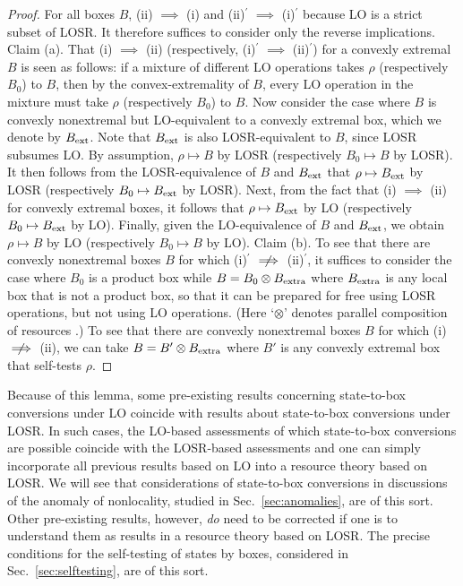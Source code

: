 \documentclass[12pt]{article}
\theoremstyle{plain}
\theoremstyle{definition}
\newcommand{\nimplies}{\centernot{\implies}}
\begin{document}
\begin{proof}
 For all boxes $B$,  (ii) $\implies$ (i) and (ii)$^{\prime}$ $\implies$ (i)$^{\prime}$ because LO is a strict subset of LOSR.  It therefore suffices to consider only the reverse implications.
Claim (a).  That (i) $\implies$ (ii) (respectively, (i)$^{\prime}$ $\implies$ (ii)$^{\prime}$) for a convexly extremal $B$ is seen as follows: if a mixture of different LO operations takes $\rho$ (respectively $B_0$) to $B$, then by the convex-extremality of $B$, every LO operation in the mixture must take $\rho$ (respectively $B_0$) to $B$.   Now consider the case where $B$ is convexly nonextremal but LO-equivalent to a convexly extremal box, which we denote by $B_{\rm ext}$.
Note that $B_{\rm ext}$ is also LOSR-equivalent to $B$, since LOSR subsumes LO.  By assumption, $\rho \mapsto B$ by LOSR (respectively $B_0 \mapsto B$ by LOSR).  It then follows from the LOSR-equivalence of 
$B$ and $B_{\rm ext}$  that $\rho \mapsto B_{\rm ext}$ by LOSR (respectively $B_0 \mapsto B_{\rm ext}$ by LOSR).  Next, from the fact that  (i) $\implies$ (ii) for convexly extremal boxes, it follows that $\rho \mapsto B_{\rm ext}$ by LO (respectively $B_0 \mapsto B_{\rm ext}$ by LO).  Finally, given the LO-equivalence of $B$ and $B_{\rm ext}$, we obtain $\rho \mapsto B$ by LO (respectively $B_0 \mapsto B$ by LO).   Claim (b).  To see that there are convexly nonextremal boxes $B$ for which  (i)$^{\prime}$ $\nimplies$ (ii)$^{\prime}$, it suffices to consider the case where $B_0$ is a product box  while $B = B_0  \otimes B_{\rm extra}$ where 
$B_{\rm extra}$ is any local box that is not a product box, so that it can be prepared for free using LOSR operations, but not using LO operations. (Here `$\otimes$' denotes parallel composition of resources \cite{coecke2016mathematical}.) To see that there are convexly nonextremal boxes $B$ for which (i) $\nimplies$ (ii), we can take  $B = B'  \otimes B_{\rm extra}$ where $B'$ is any convexly extremal box that self-tests $\rho$.
\end{proof}


Because of this lemma, some pre-existing results concerning state-to-box conversions under LO coincide with results about state-to-box conversions under LOSR.  In such cases, the LO-based assessments of which state-to-box conversions are possible coincide with the LOSR-based assessments and one can simply incorporate all previous results based on LO  into a resource theory based on LOSR. 
We will see that considerations of state-to-box conversions in discussions of the anomaly of nonlocality, studied in Sec.~\ref{sec:anomalies}, are of this sort.  Other pre-existing results, however, {\em do} need to be corrected if one is to understand them as results in a resource theory based on LOSR. 
  The precise conditions for the self-testing of states by boxes, considered in Sec.~\ref{sec:selftesting}, are of this sort.\\
\end{document}
